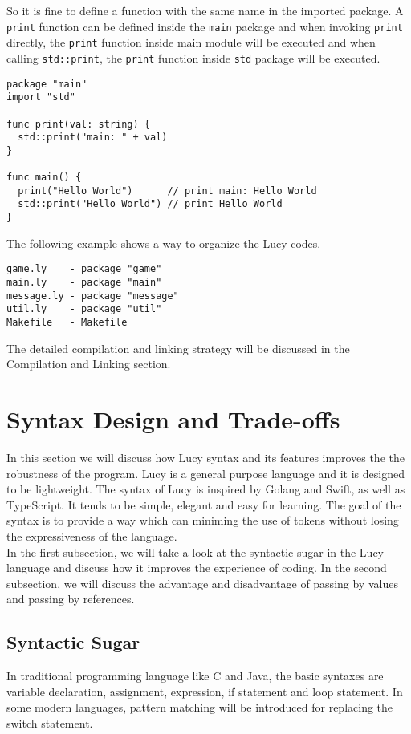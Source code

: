 So it is fine to define a function with the same name in the imported package. A \texttt{print} function can be defined inside the \texttt{main} package and when invoking \texttt{print} directly, the \texttt{print} function inside main module will be executed and when calling \texttt{std::print}, the \texttt{print} function inside \texttt{std} package will be executed.
\begin{lstlisting}
package "main"
import "std"

func print(val: string) {
  std::print("main: " + val)
}

func main() {
  print("Hello World")      // print main: Hello World
  std::print("Hello World") // print Hello World
}
\end{lstlisting}
The following example shows a way to organize the Lucy codes.
\begin{lstlisting}
game.ly    - package "game"
main.ly    - package "main"
message.ly - package "message"
util.ly    - package "util"
Makefile   - Makefile
\end{lstlisting}
The detailed compilation and linking strategy will be discussed in the Compilation and Linking section.


\section{Syntax Design and Trade-offs}
In this section we will discuss how Lucy syntax and its features improves the the robustness of the program. Lucy is a general purpose language and it is designed to be lightweight. The syntax of Lucy is inspired by Golang and Swift, as well as TypeScript. It tends to be simple, elegant and easy for learning. The goal of the syntax is to provide a way which can miniming the use of tokens without losing the expressiveness of the language. \\
In the first subsection, we will take a look at the syntactic sugar in the Lucy language and discuss how it improves the experience of coding. In the second subsection, we will discuss the advantage and disadvantage of passing by values and passing by references.

\subsection{Syntactic Sugar}
In traditional programming language like C and Java, the basic syntaxes are variable declaration, assignment, expression, if statement and loop statement. In some modern languages, pattern matching will be introduced for replacing the switch statement.

